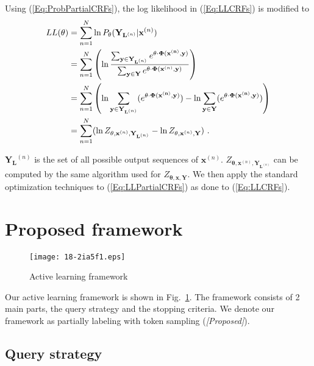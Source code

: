 \documentclass[english]{jnlp_JS2.0}
\begin{document}
Using (\ref{Eq:ProbPartialCRFs}), the log likelihood in (\ref{Eq:LLCRFs}) is modified to
\begin{align}
LL(\mathbf{\theta}) & = \sum_{n=1}^{N} \ln P_{\mathbf{\theta}} (\mathbf{Y}_{\mathbf{L}^{(n)}}|\mathbf{x}^{(n)}) \notag \\
	& = \sum_{n=1}^{N} \left(\ln \frac {\sum_{\mathbf{y} \in \mathbf{Y}_{\mathbf{L}^{(n)}}} e^{\mathbf{\theta \cdot \Phi(x^{(n)},y)}}}
		{\sum_{\mathbf{y \in Y}} e^{\mathbf{\theta \cdot \Phi}(\mathbf{x}^{(n)},\mathbf{y})}}\right) \notag \\
	& = \sum_{n=1}^{N} \left(\ln \sum_{\mathbf{y} \in \mathbf{Y}_{\mathbf{L}^{(n)}}} (e^{\mathbf{\theta \cdot \Phi (x^{(n)},y)}}) - \ln \sum_{\mathbf{y \in Y}} (e^{\mathbf{\theta \cdot \Phi (x^{(n)},y)}})\right) \notag \\
	& = \sum_{n=1}^{N} (\ln Z_{\mathbf{\theta}, \mathbf{x}^{(n)}, \mathbf{Y}_{\mathbf{L}^{(n)}}} - \ln Z_{\mathbf{\theta}, \mathbf{x}^{(n)}, \mathbf{Y}})\ . \label{Eq:LLPartialCRFs}
\end{align}

$\mathbf{Y_L}^{(n)}$ is the set of all possible output sequences of $\mathbf{x}^{(n)}$. $Z_{\mathbf{\theta}, \mathbf{x}^{(n)}, \mathbf{Y}_{\mathbf{L}^{(n)}}}$ can be computed by the same algorithm used for $Z_{\mathbf{\theta,x,Y}}$. We then apply the standard optimization techniques to (\ref{Eq:LLPartialCRFs}) as done to (\ref{Eq:LLCRFs}).



\section{Proposed framework}
\label{Sec:Proposed}

\begin{figure}[b]
\begin{center}
\texttt{[image: 18-2ia5f1.eps]}
\end{center}
	\caption{Active learning framework}
	\label{Fig:ProposedFramework}
\end{figure}

Our active learning framework is shown in Fig.~\ref{Fig:ProposedFramework}. 
\pagebreak
The framework consists of 2 main parts, the query strategy and the stopping criteria. We denote our framework as partially labeling with token sampling (\textit{[Proposed]}).



\subsection{Query strategy}
\end{document}
